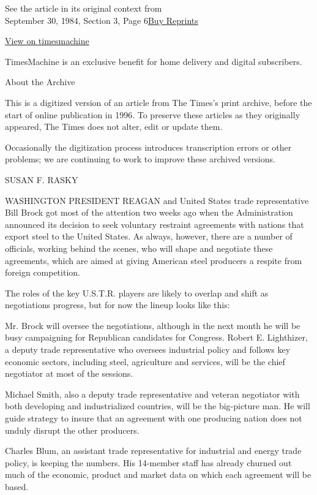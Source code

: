 See the article in its original context from\\
September 30, 1984, Section 3, Page
6\href{https://store.nytimes.com/collections/new-york-times-page-reprints?utm_source=nytimes\&utm_medium=article-page\&utm_campaign=reprints}{Buy
Reprints}

\href{http://timesmachine.nytimes.com/timesmachine/1984/09/30/236738.html}{View
on timesmachine}

TimesMachine is an exclusive benefit for home delivery and digital
subscribers.

About the Archive

This is a digitized version of an article from The Times's print
archive, before the start of online publication in 1996. To preserve
these articles as they originally appeared, The Times does not alter,
edit or update them.

Occasionally the digitization process introduces transcription errors or
other problems; we are continuing to work to improve these archived
versions.

SUSAN F. RASKY

WASHINGTON PRESIDENT REAGAN and United States trade representative Bill
Brock got most of the attention two weeks ago when the Administration
announced its decision to seek voluntary restraint agreements with
nations that export steel to the United States. As always, however,
there are a number of officials, working behind the scenes, who will
shape and negotiate these agreements, which are aimed at giving American
steel producers a respite from foreign competition.

The roles of the key U.S.T.R. players are likely to overlap and shift as
negotiations progress, but for now the lineup looks like this:

Mr. Brock will oversee the negotiations, although in the next month he
will be busy campaigning for Republican candidates for Congress. Robert
E. Lighthizer, a deputy trade representative who oversees industrial
policy and follows key economic sectors, including steel, agriculture
and services, will be the chief negotiator at most of the sessions.

Michael Smith, also a deputy trade representative and veteran negotiator
with both developing and industrialized countries, will be the
big-picture man. He will guide strategy to insure that an agreement with
one producing nation does not unduly disrupt the other producers.

Charles Blum, an assistant trade representative for industrial and
energy trade policy, is keeping the numbers. His 14-member staff has
already churned out much of the economic, product and market data on
which each agreement will be based.

